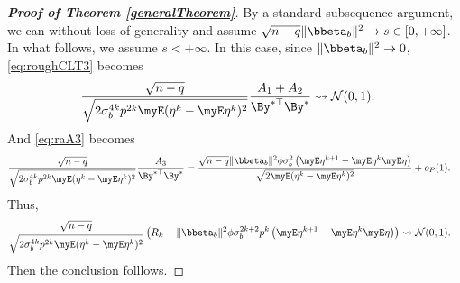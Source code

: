 \begin{proof}[\textbf{Proof of Theorem \ref{generalTheorem}}]
By a standard subsequence argument, we can without loss of generality and assume
$\sqrt{n-q} \|\bbeta_b\|^2 \to s \in [0,+\infty]$.
In what follows, we assume $s<+\infty$.
In this case, since $\|\bbeta_b\|^2\to 0$, \eqref{eq:roughCLT3} becomes
    \begin{equation*}
        \begin{split}
    &
    \frac{
        \sqrt{n-q}
    }{\sqrt{
            2
            \sigma_b^{4k} p^{2k}
         \myE (\eta^k - \myE \eta^k)^2
    }}
    \frac{
        A_1+A_2
    }{\By^{*\top} \By^*}
    \rightsquigarrow \mathcal N(0,1).
        \end{split}
    \end{equation*}
    And \eqref{eq:raA3} becomes
\begin{equation*}
    \begin{split}
    &\frac{
        \sqrt{n-q}
    }{\sqrt{
            2
            \sigma_b^{4k} p^{2k}
            \myE (\eta^k - \myE \eta^k)^2
    }}
    \frac{
        A_3
    }{\By^{*\top} \By^*}
    =
    \frac{
         \sqrt{n-q} \|\bbeta_b\|^2 \phi \sigma_b^{2}  \left(\myE \eta^{k+1} - \myE \eta^k \myE \eta\right)
    }{\sqrt{
                2 \myE (\eta^k - \myE \eta^k)^2
        }}
        +o_P(1)
        .
    \end{split}
\end{equation*}
Thus,
\begin{equation*}
    \begin{split}
    &
    \frac{
        \sqrt{n-q}
    }{\sqrt{
            2
            \sigma_b^{4k} p^{2k}
            \myE (\eta^k - \myE \eta^k)^2
    }}
    \left( 
        R_k
    -
          \|\bbeta_b\|^2 \phi \sigma_b^{2k+2} p^k  \left(\myE \eta^{k+1} - \myE \eta^k \myE \eta\right)
    \right)
        \rightsquigarrow \mathcal N (0,1).
    \end{split}
\end{equation*}
Then the conclusion folllows.

\end{proof}

